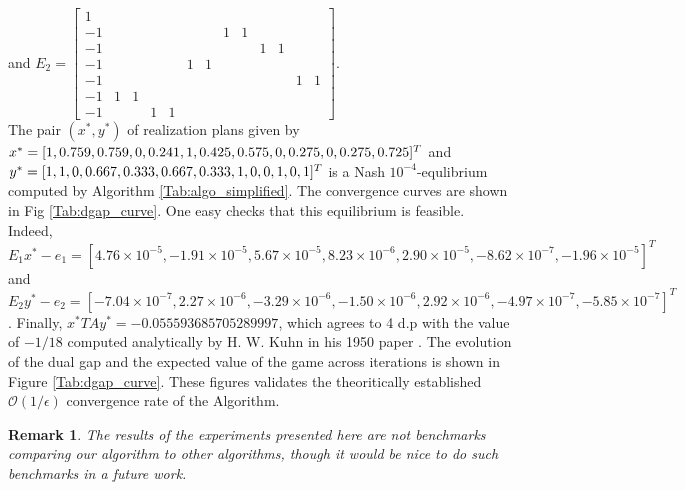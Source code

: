 \documentclass[12pt]{article}
\newtheorem{remark}{Remark}
\begin{document}
and $E_2 = \left[\begin{array}{ccccccccccccc}
1 &   &   &   &   &   &   &   &   &   &   &   &  \\
-1 &   &   &   &   &   &   & 1 & 1 &   &   &   &  \\
-1 &   &   &   &   &   &   &   &   & 1 & 1 &   &  \\
-1 &   &   &   &   & 1 & 1 &   &   &   &   &   &  \\
-1 &   &   &   &   &   &   &   &   &   &   & 1 & 1\\
-1 & 1 & 1 &   &   &   &   &   &   &   &   &   &  \\
-1 &   &   & 1 & 1 &   &   &   &   &   &   &   &  
\end{array}\right]$.\\

The pair $(x^*, y^*)$ of realization plans given by $x^* = [1, 0.759, 0.759, 0, 0.241, \\
1, 0.425, 0.575, 0, 0.275, 0, 0.275, 0.725]^T$ and $y^* = [1, 1, 0, 0.667, 0.333, 0.667, \\
0.333, 1, 0, 0, 1, 0, 1]^T$ is a Nash $10^{-4}$-equlibrium computed by Algorithm  \ref{Tab:algo_simplified}. The convergence curves are shown in Fig \ref{Tab:dgap_curve}. One easy checks that this equilibrium is feasible. Indeed,  $E_1x^* - e_1 = [4.76 \times 10^{-5}, -1.91 \times 10^{-5}, 5.67 \times 10^{-5}, 8.23 \times 10^{-6}, 2.90 \times 10^{-5}, -8.62 \times 10^{-7}, -1.96 \times 10^{-5}]^T$ and $E_2y^* - e_2 = [-7.04 \times 10^{-7}, 2.27 \times 10^{-6}, -3.29 \times 10^{-6}, -1.50 \times 10^{-6}, 2.92 \times 10^{-6}, -4.97 \times 10^{-7}, -5.85 \times 10^{-7}]^T$. Finally, $x^*TAy^* = -0.055593685705289997$, which agrees to 4 d.p with the value of $-1 / 18$ computed analytically by H. W. Kuhn in his 1950 paper \cite{kuhn}. The evolution of the dual gap and the expected value of the game across iterations is shown in Figure \ref{Tab:dgap_curve}. These figures validates the theoritically established $\mathcal{O}(1/\epsilon)$ convergence rate of the Algorithm.

\begin{remark}
The results of the experiments presented here are not benchmarks comparing our algorithm to other algorithms, though it would be nice to do such benchmarks in a future work.
\end{remark}
\end{document}
